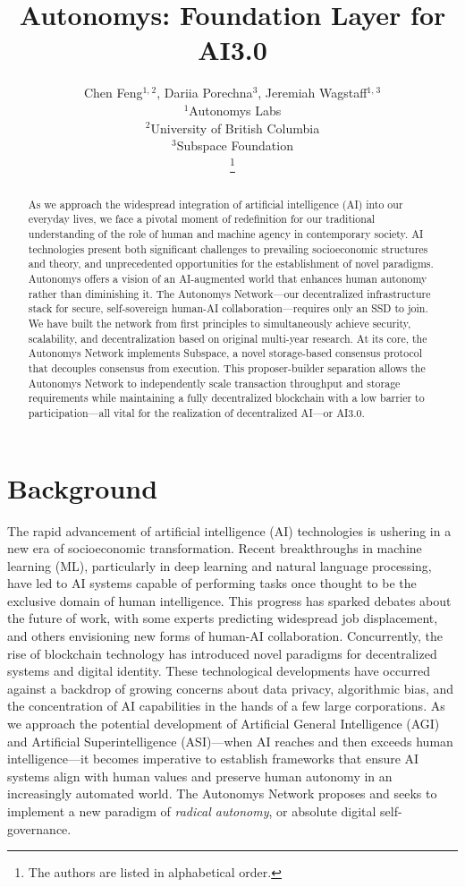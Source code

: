 \documentclass[conference]{IEEEtran}
\title{Autonomys: Foundation Layer for AI3.0}
\author{Chen Feng$^{1,}$$^{2}$, Dariia Porechna$^{3}$, Jeremiah Wagstaff$^{1,}$$^{3}$\\
$^1$Autonomys Labs\\
$^2$University of British Columbia\\
$^3$Subspace Foundation\\


\thanks{The authors are listed in alphabetical order.}}
\begin{document}
\pagestyle{plain}
\fancyhf{}
\cfoot{\thepage}
\maketitle
\begin{abstract}
As we approach the widespread integration of artificial intelligence (AI) into our everyday lives, we face a pivotal moment of redefinition for our traditional understanding of the role of human and machine agency in contemporary society. AI technologies present both significant challenges to prevailing socioeconomic structures and theory, and unprecedented opportunities for the establishment of novel paradigms. Autonomys offers a vision of an AI-augmented world that enhances human autonomy rather than diminishing it. The Autonomys Network—our decentralized infrastructure stack for secure, self-sovereign human-AI collaboration—requires only an SSD to join. We have built the network from first principles to simultaneously achieve security, scalability, and decentralization based on original multi-year research. At its core, the Autonomys Network implements Subspace, a novel storage-based consensus protocol that decouples consensus from execution. This proposer-builder separation allows the Autonomys Network to independently scale transaction throughput and storage requirements while maintaining a fully decentralized blockchain with a low barrier to participation—all vital for the realization of decentralized AI—or AI3.0.
\end{abstract}

\section{Background}

The rapid advancement of artificial intelligence (AI) technologies is ushering in a new era of socioeconomic transformation. Recent breakthroughs in machine learning (ML), particularly in deep learning and natural language processing, have led to AI systems capable of performing tasks once thought to be the exclusive domain of human intelligence\cite{lecun2015}. This progress has sparked debates about the future of work, with some experts predicting widespread job displacement\cite{frey2017}, and others envisioning new forms of human-AI collaboration\cite{brynjolfsson2014}. Concurrently, the rise of blockchain technology has introduced novel paradigms for decentralized systems and digital identity\cite{zheng2017}. These technological developments have occurred against a backdrop of growing concerns about data privacy, algorithmic bias, and the concentration of AI capabilities in the hands of a few large corporations\cite{oneil2016}. As we approach the potential development of Artificial General Intelligence (AGI) and Artificial Superintelligence (ASI)—when AI reaches and then exceeds human intelligence\cite{bostrom2014}—it becomes imperative to establish frameworks that ensure AI systems align with human values and preserve human autonomy in an increasingly automated world\cite{russell2019}. The Autonomys Network proposes and seeks to implement a new paradigm of \textit{radical autonomy}, or absolute digital self-governance.
\end{document}
